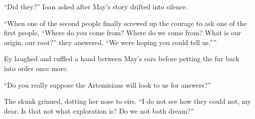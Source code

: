 ``Did they?'' Ioan asked after May's story drifted into silence.

``When one of the second people finally screwed up the courage to ask one of the first people, ``Where do you come from? Where do we come from? What is our origin, our root?'' they answered, ``We were hoping you could tell us.''''

Ey laughed and ruffled a hand between May's ears before petting the fur back into order once more.

``Do you really suppose the Artemisians will look to us for answers?''

The skunk grinned, dotting her nose to eirs. ``I do not see how they could not, my dear. Is that not what exploration is? Do we not both dream?''
